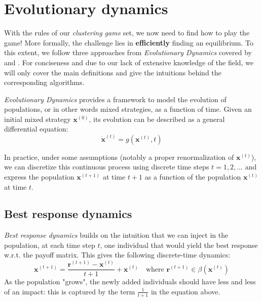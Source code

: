 \documentclass[11pt,a4paper]{article}
\begin{document}
\section{Evolutionary dynamics}
\label{sec:evo-dyn}

With the rules of our \textit{clustering game} set, we now need to find how to play the game! More formally, the challenge lies in \textbf{efficiently} finding an equilibrium. To this extent, we follow three approaches from \textit{Evolutionary Dynamics} covered by \cite{bulo-thesis} and \cite{game-clustering}. For conciseness and due to our lack of extensive knowledge of the field, we will only cover the main definitions and give the intuitions behind the corresponding algorithms.

\textit{Evolutionary Dynamics} provides a framework to model the evolution of populations, or in other words mixed strategies, as a function of time. Given an initial mixed strategy $\mathbf{x}^{(0)}$, its evolution can be described as a general differential equation: 
\begin{equation}
    \dot{\mathbf{x}}^{(t)} = g(\mathbf{x}^{(t)}, t)
\end{equation}

In practice, under some assumptions (notably a proper renormalization of $\mathbf{x}^{(t)}$), we can discretize this continuous process using discrete time steps $t=1, 2, \ldots$ and express the population $\mathbf{x}^{(t+1)}$ at time $t+1$ as a function of the population $\mathbf{x}^{(t)}$ at time $t$.

\subsection*{Best response dynamics}
\textit{Best response dynamics} builds on the intuition that we can inject in the population, at each time step $t$, one individual that would yield the best response w.r.t. the payoff matrix. This gives the following discrete-time dynamics:
\begin{equation}
    \label{eq:best-response}
    \mathbf{x}^{(t+1)} = \frac{ \mathbf{r}^{(t+1)} -  \mathbf{x}^{(t)}}{t + 1} + \mathbf{x}^{(t)} \quad \text{where } \mathbf{r}^{(t+1)}\in\beta(\mathbf{x}^{(t)})
\end{equation}
As the population "grows", the newly added individuals should have less and less of an impact: this is captured by the term $\frac{1}{t+1}$ in the equation above.
\end{document}

